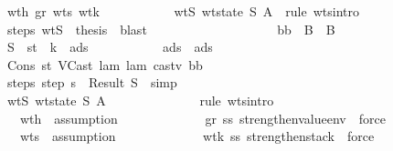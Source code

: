 \begin{isabellebody}
\ \ \ \ \ \ \ \ \ \ \isamarkupfalse \ wth{}\ gr{}\ wts\ wtk{}\isanewline
\ \ \ \ \ \ \ \ \ \ \isamarkupfalse \ wtS{\isacharcolon}\ {\isachardoublequoteopen}wt{\isacharunderscore}state\ {\isacharquery}S\ A{\isachardoublequoteclose}\ \isamarkupfalse \ {\isacharparenleft}rule\ wts{\isacharunderscore}intro{\isacharparenright}\isanewline
\ \ \ \ \ \ \ \ \ \ \isamarkupfalse \ steps\ wtS\ \isamarkupfalse \ {\isacharquery}thesis\ \isamarkupfalse \ blast\isanewline
\ \ \ \ \ \ \ \ \isamarkupfalse \isanewline
\ \ \ \ \ \ \ \ \ \ \isamarkupfalse \ b{}b{\isacharcolon}\ {\isachardoublequoteopen}{\isasymnot}\ B\ {\isasymsqsubseteq}\ B{}{\isachardoublequoteclose}\isanewline
\ \ \ \ \ \ \ \ \ \ \isamarkupfalse \ {\isacharquery}S\ {\isacharequal}\ {\isachardoublequoteopen}{\isacharparenleft}st{\isacharcomma}\ {\isasymrho}{\isacharcomma}\ k{\isacharcomma}\ {\isasymmu}{\isacharprime}{\isacharcomma}\ ads{}{\isacharparenright}{\isachardoublequoteclose}\isanewline
\ \ \ \ \ \ \ \ \ \ \isamarkupfalse \ {\isacharquery}ads\ {\isacharequal}\ {\isachardoublequoteopen}ads{}{\isachardoublequoteclose}\isanewline
\ \ \ \ \ \ \ \ \ \ \isamarkupfalse \ Cons\ st\ VCast\ lam\ lam{}\ castv\ b{}b\isanewline
\ \ \ \ \ \ \ \ \ \ \isamarkupfalse \ steps{\isacharcolon}\ {\isachardoublequoteopen}step\ s\ {\isacharequal}\ Result\ {\isacharquery}S{\isachardoublequoteclose}\ \isamarkupfalse \ simp\isanewline
\ \ \ \ \ \ \ \ \ \ \isanewline
\ \ \ \ \ \ \ \ \ \ \isamarkupfalse \ wtS{\isacharcolon}\ {\isachardoublequoteopen}wt{\isacharunderscore}state\ {\isacharquery}S\ A{\isachardoublequoteclose}\ \isanewline
\ \ \ \ \ \ \ \ \ \ \ \ \isamarkupfalse \ {\isacharparenleft}rule\ wts{\isacharunderscore}intro{\isacharparenright}\isanewline
\ \ \ \ \ \ \ \ \ \ \ \ \isamarkupfalse \ wth{}\ \isamarkupfalse \ assumption\isanewline
\ \ \ \ \ \ \ \ \ \ \ \ \isamarkupfalse \ gr\ ss\ strengthen{\isacharunderscore}value{\isacharunderscore}env\ \isamarkupfalse \ force\isanewline
\ \ \ \ \ \ \ \ \ \ \ \ \isamarkupfalse \ wts\ \isamarkupfalse \ assumption\isanewline
\ \ \ \ \ \ \ \ \ \ \ \ \isamarkupfalse \ wt{\isacharunderscore}k\ ss\ strengthen{\isacharunderscore}stack\ \isamarkupfalse \ force\ \isamarkupfalse \isanewline

\end{isabellebody}
